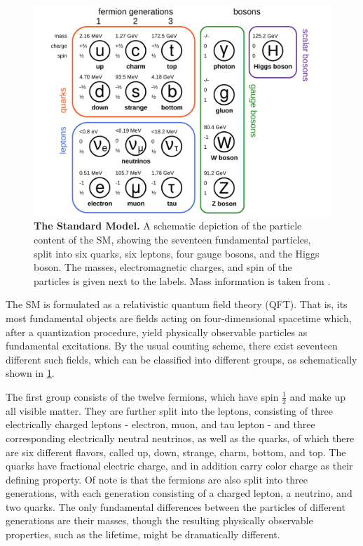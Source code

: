 \begin{figure}[ht]
    \centering
    \includegraphics[width=0.9 \textwidth]{figures/smsketch_colors.pdf}
    \caption{\textbf{The Standard Model.} A schematic depiction of the particle content of the SM, showing the seventeen fundamental particles, split into six quarks, six leptons, four gauge bosons, and the Higgs boson. The masses, electromagnetic charges, and spin of the particles is given next to the labels. Mass information is taken from .}
    \label{fig:theory:sm}
\end{figure}

The SM is formulated as a relativistic quantum field theory (QFT). That is, its most fundamental objects are fields acting on four-dimensional spacetime which, after a quantization procedure, yield physically observable particles as fundamental excitations. By the usual counting scheme, there exist seventeen different such fields, which can be classified into different groups, as schematically shown in \cref{fig:theory:sm}.

The first group consists of the twelve fermions, which have spin $\frac{1}{2}$ and make up all visible matter. They are further split into the leptons, consisting of three electrically charged leptons - electron, muon, and tau lepton - and three corresponding electrically neutral neutrinos, as well as the quarks, of which there are six different flavors, called up, down, strange, charm, bottom, and top. The quarks have fractional electric charge, and in addition carry color charge as their defining property. Of note is that the fermions are also split into three generations, with each generation consisting of a charged lepton, a neutrino, and two quarks. The only fundamental differences between the particles of different generations are their masses, though the resulting physically observable properties, such as the lifetime, might be dramatically different.

